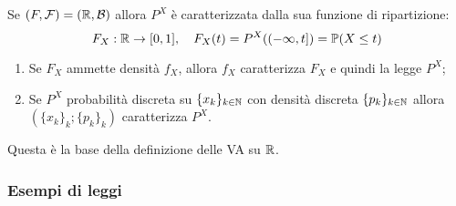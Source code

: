 \medskip
\begin{oss}
  Se $(F, \mathcal F) = (\mathbb R, \mathcal B)$ allora $P^X$ è caratterizzata dalla sua funzione di ripartizione:
  $$F_X: \mathbb R \to [0,1], \quad F_X (t) = P^X((-\infty, t]) = \mathbb P(X \leq t)$$
  \begin{enumerate}
    \item Se $F_X$ ammette densità $f_X$, allora $f_X$ caratterizza $F_X$ e quindi la legge $P^X$;
    \item Se $P^X$ probabilità discreta su $\{x_k\}_{k \in \mathbb N}$ con densità discreta $\{p_k\}_{k \in \mathbb N}$ allora $(\{x_k\}_k ; \{p_k\}_k)$ caratterizza $P^X$.
  \end{enumerate}
  Questa è la base della definizione delle VA su $\mathbb R$.
\end{oss}

\subsubsection{Esempi di leggi}
